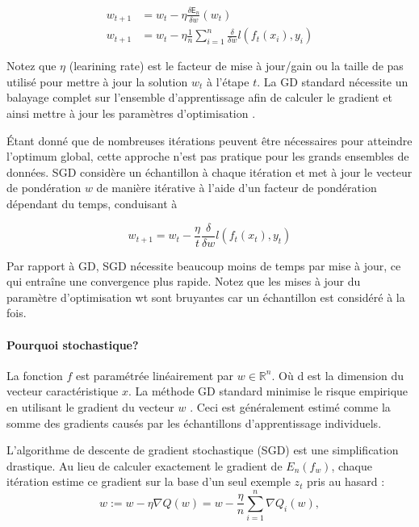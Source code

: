 	\begin{equation*}
		\begin{split}
		w_{t+1}  & = w_t - \eta {\frac {\delta \mathsf{E}_n }{\delta w}(w_t)} \\
		w_{t+1}  & = w_t - \eta \frac{1}{n} \sum_{i=1}^{n}  {\frac {\delta }{\delta w} l(f_t(x_i),y_i)}
		\end{split}
	\end{equation*}
	
	
	
	Notez que $\eta$ (learining rate) est le facteur de mise à jour/gain ou la taille de pas utilisé pour mettre à jour la solution $w_t$ à l'étape $t$. La GD standard nécessite un balayage complet sur l'ensemble d'apprentissage afin de calculer le gradient et ainsi mettre à jour les paramètres d'optimisation \cite{wijnhoven2010fast}.
	
	Étant donné que de nombreuses itérations peuvent être nécessaires pour atteindre l'optimum global, cette approche n'est pas pratique pour les grands ensembles de données. SGD considère un échantillon à chaque itération et met à jour le vecteur de pondération $w$ de manière itérative à l'aide d'un facteur de pondération dépendant du temps, conduisant à 
	
	\begin{equation*}
		{\displaystyle w_{t+1} = w_t -  \frac{\eta}{t}  {\frac {\delta }{\delta w} l(f_t(x_t),y_t)}}
	\end{equation*}
	
	Par rapport à GD, SGD nécessite beaucoup moins de temps par mise à jour, ce qui entraîne une convergence plus rapide. Notez que les mises à jour du paramètre d'optimisation wt sont bruyantes car un échantillon est considéré à la fois.
	
	
	\paragraph{Pourquoi stochastique?}
	La fonction $f$ est paramétrée linéairement par $ w \in  \mathbb{R}^n $. Où d est la dimension du vecteur caractéristique $ x $. La méthode GD standard minimise le risque empirique  en utilisant le gradient du vecteur $ w $ \cite{wijnhoven2010fast}. Ceci est généralement estimé comme la somme des gradients causés par les échantillons d'apprentissage individuels. 
	
	L'algorithme de descente de gradient stochastique (SGD) est une simplification drastique. Au lieu de calculer exactement le gradient de $E_n (f_w )$, chaque itération estime ce gradient sur la base d'un seul exemple $z_t$ pris au hasard \cite{bottou2012stochastic} :
	$$
	{\displaystyle w:=w-\eta \nabla Q(w)=w-{\frac {\eta }{n}}\sum _{i=1}^{n}\nabla Q_{i}(w),}
	$$
	
